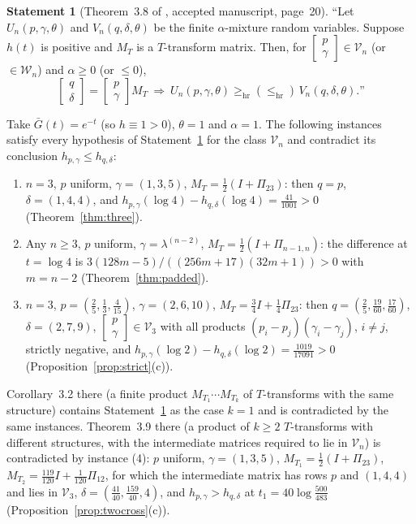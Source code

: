 \documentclass[10pt]{article}
\theoremstyle{plain}
\theoremstyle{definition}
\newtheorem{statement}[theorem]{Statement}
\theoremstyle{remark}
\newcommand{\hr}{\mathrm{hr}}
\newcommand{\bmat}[2]{\begin{bmatrix} #1 \\ #2 \end{bmatrix}}
\begin{document}
\begin{statement}[Theorem~3.8 of \cite{SahooKayalFinkelstein2026}, accepted manuscript, page~20]\label{st:SKF}
``Let $U_n(p,\gamma,\theta)$ and $V_n(q,\delta,\theta)$ be the finite $\alpha$-mixture random variables. Suppose $h(t)$ is positive and $M_T$ is a $T$-transform matrix. Then, for $[\begin{smallmatrix}p\\ \gamma\end{smallmatrix}]\in\mathcal V_n$ (or $\in\mathcal W_n$) and $\alpha\ge 0$ (or $\le 0$),
\[
\bmat{q}{\delta}=\bmat{p}{\gamma}M_T\ \Longrightarrow\ U_n(p,\gamma,\theta)\ge_{\hr}(\le_{\hr})\,V_n(q,\delta,\theta).\text{''}
\]
\end{statement}

Take $\bar G(t)=e^{-t}$ (so $h\equiv 1>0$), $\theta=1$ and $\alpha=1$. The following instances satisfy every hypothesis of Statement~\ref{st:SKF} for the class $\mathcal V_n$ and contradict its conclusion $h_{p,\gamma}\le h_{q,\delta}$:
\begin{enumerate}
\item[(1)] $n=3$, $p$ uniform, $\gamma=(1,3,5)$, $M_T=\tfrac12(I+\Pi_{23})$: then $q=p$, $\delta=(1,4,4)$, and $h_{p,\gamma}(\log 4)-h_{q,\delta}(\log 4)=\tfrac{41}{1001}>0$ (Theorem~\ref{thm:three}).
\item[(2)] Any $n\ge 3$, $p$ uniform, $\gamma=\lambda^{(n-2)}$, $M_T=\tfrac12(I+\Pi_{n-1,n})$: the difference at $t=\log 4$ is $3(128m-5)/((256m+17)(32m+1))>0$ with $m=n-2$ (Theorem~\ref{thm:padded}).
\item[(3)] $n=3$, $p=(\tfrac25,\tfrac13,\tfrac4{15})$, $\gamma=(2,6,10)$, $M_T=\tfrac34I+\tfrac14\Pi_{23}$: then $q=(\tfrac25,\tfrac{19}{60},\tfrac{17}{60})$, $\delta=(2,7,9)$, $[\begin{smallmatrix}p\\ \gamma\end{smallmatrix}]\in\mathcal V_3$ with all products $(p_i-p_j)(\gamma_i-\gamma_j)$, $i\ne j$, strictly negative, and $h_{p,\gamma}(\log 2)-h_{q,\delta}(\log 2)=\tfrac{1019}{17091}>0$ (Proposition~\ref{prop:strict}(c)).
\end{enumerate}
Corollary~3.2 there (a finite product $M_{T_1}\cdots M_{T_k}$ of $T$-transforms with the same structure) contains Statement~\ref{st:SKF} as the case $k=1$ and is contradicted by the same instances. Theorem~3.9 there (a product of $k\ge 2$ $T$-transforms with different structures, with the intermediate matrices required to lie in $\mathcal V_n$) is contradicted by instance (4): $p$ uniform, $\gamma=(1,3,5)$, $M_{T_1}=\tfrac12(I+\Pi_{23})$, $M_{T_2}=\tfrac{119}{120}I+\tfrac1{120}\Pi_{12}$, for which the intermediate matrix has rows $p$ and $(1,4,4)$ and lies in $\mathcal V_3$, $\delta=(\tfrac{41}{40},\tfrac{159}{40},4)$, and $h_{p,\gamma}>h_{q,\delta}$ at $t_1=40\log\tfrac{500}{483}$ (Proposition~\ref{prop:twocross}(c)).
\end{document}
